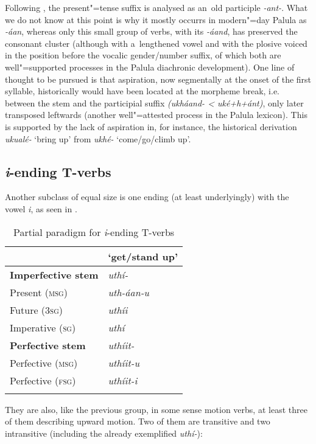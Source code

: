 Following \citet[22]{morgenstierne1941}, the present"=tense suffix is analysed as an~old participle \textit{-ant-}. What we do not know at this point is why it mostly occurrs in modern"=day Palula as \textit{-áan}, whereas only this small group of verbs, with its \textit{-áand}, has preserved the consonant cluster (although with a~lengthened vowel and with the plosive voiced in the position before the vocalic gender/number suffix, of which both are well"=supported processes in the Palula diachronic development). One line of thought to be pursued is that aspiration, now segmentally at the onset of the first syllable, historically would have been located at the morpheme break, i.e. between the stem and the participial suffix \textit{(ukháand- {\textless} uké+h+ánt)}, only later transposed leftwards (another well"=attested process in the Palula lexicon). This is supported by the lack of aspiration in, for instance, the historical derivation \textit{ukualé-} `bring up' from \textit{ukhé-} `come/go/climb up'.


\subsection{\textit{i}-ending T-verbs}
\label{subsec:8-3-9}


Another subclass of equal size is one ending (at least underlyingly) with the vowel \textit{i}, as seen in .


\begin{table}[ht]
\caption{Partial paradigm for \textit{i}-ending T-verbs}
\begin{tabularx}{.75\textwidth}{ Q Q }
\lsptoprule
&
\textbf{`get/stand up'}\\\hline
\textbf{Imperfective stem} &
\textit{uthí-} \\
Present (\textsc{msg}) &
\textit{uth-áan-u} \\
Future (\textsc{3sg}) &
\textit{uthíi} \\
Imperative (\textsc{sg}) &
\textit{uthí} \\
\textbf{Perfective stem} &
\textit{uthíit-} \\
Perfective (\textsc{msg}) &
\textit{uthíit-u} \\
Perfective (\textsc{fsg}) &
\textit{uthíit-i} \\\lspbottomrule
\end{tabularx}
\label{tab:8-11}
\end{table}


They are also, like the previous group, in some sense motion verbs, at least three of them describing upward motion. Two of them are transitive and two intransitive (including the already exemplified \textit{uthí-}):


